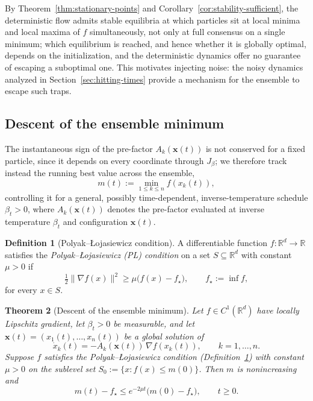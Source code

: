 \documentclass{article}
\theoremstyle{plain}
\newtheorem{theorem}{Theorem}[section]
\theoremstyle{definition}
\newtheorem{definition}[theorem]{Definition}
\theoremstyle{remark}
\newcommand{\prefactor}[2]{A_{#1}(#2)}
\newcommand{\xx}{\mathbf{x}}
\newcommand{\R}{\mathbb{R}}
\begin{document}
By Theorem~\ref{thm:stationary-points} and Corollary~\ref{cor:stability-sufficient}, the deterministic flow admits stable equilibria at which particles sit at local minima and local maxima of $f$ simultaneously, not only at full consensus on a single minimum; which equilibrium is reached, and hence whether it is globally optimal, depends on the initialization, and the deterministic dynamics offer no guarantee of escaping a suboptimal one. This motivates injecting noise: the noisy dynamics analyzed in Section~\ref{sec:hitting-times} provide a mechanism for the ensemble to escape such traps.

\subsection{Descent of the ensemble minimum}
\label{sec:convergence-rate}

The instantaneous sign of the pre-factor $\prefactor{k}{\xx(t)}$ is not conserved for a fixed particle, since it depends on every coordinate through $J_\beta$; we therefore track instead the running best value across the ensemble,
\[
    m(t):=\min_{1\le k\le n}f(x_k(t)),
\]
controlling it for a general, possibly time-dependent, inverse-temperature schedule $\beta_t>0$, where $\prefactor{k}{\xx(t)}$ denotes the pre-factor evaluated at inverse temperature $\beta_t$ and configuration $\xx(t)$.

\begin{definition}[Polyak--\L{}ojasiewicz condition]
    \label{def:pl-condition}
    A differentiable function $f:\R^d\to\R$ satisfies the \textit{Polyak--\L{}ojasiewicz (PL) condition} on a set $S\subseteq\R^d$ with constant $\mu>0$ if
    \[
        \tfrac12\|\nabla f(x)\|^2\ge\mu\bigl(f(x)-f_\star\bigr), \qquad f_\star:=\inf f,
    \]
    for every $x\in S$.
\end{definition}


\begin{theorem}[Descent of the ensemble minimum]
    \label{thm:ensemble-min}
    Let $f\in C^1(\R^d)$ have locally Lipschitz gradient, let $\beta_t>0$ be measurable, and let $\xx(t)=(x_1(t),\dots,x_n(t))$ be a global solution of
    \[
        \dot x_k(t)=-\prefactor{k}{\xx(t)}\,\nabla f(x_k(t)), \qquad k=1,\dots,n.
    \]
    Suppose $f$ satisfies the Polyak--\L{}ojasiewicz condition (Definition~\ref{def:pl-condition}) with constant $\mu>0$ on the sublevel set $S_0:=\{x:f(x)\le m(0)\}$. Then $m$ is nonincreasing and
    \[
        m(t)-f_\star\le e^{-2\mu t}\bigl(m(0)-f_\star\bigr), \qquad t\ge0.
    \]
\end{theorem}
\end{document}
